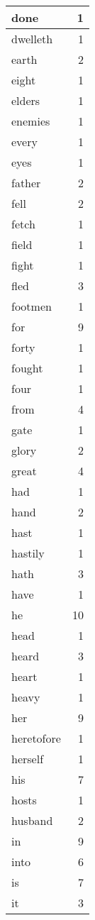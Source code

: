 \begin{center}
\begin{longtable}{l|r}
done & 1 \\ \hline
dwelleth & 1 \\ \hline
earth & 2 \\ \hline
eight & 1 \\ \hline
elders & 1 \\ \hline
enemies & 1 \\ \hline
every & 1 \\ \hline
eyes & 1 \\ \hline
father & 2 \\ \hline
fell & 2 \\ \hline
fetch & 1 \\ \hline
field & 1 \\ \hline
fight & 1 \\ \hline
fled & 3 \\ \hline
footmen & 1 \\ \hline
for & 9 \\ \hline
forty & 1 \\ \hline
fought & 1 \\ \hline
four & 1 \\ \hline
from & 4 \\ \hline
gate & 1 \\ \hline
glory & 2 \\ \hline
great & 4 \\ \hline
had & 1 \\ \hline
hand & 2 \\ \hline
hast & 1 \\ \hline
hastily & 1 \\ \hline
hath & 3 \\ \hline
have & 1 \\ \hline
he & 10 \\ \hline
head & 1 \\ \hline
heard & 3 \\ \hline
heart & 1 \\ \hline
heavy & 1 \\ \hline
her & 9 \\ \hline
heretofore & 1 \\ \hline
herself & 1 \\ \hline
his & 7 \\ \hline
hosts & 1 \\ \hline
husband & 2 \\ \hline
in & 9 \\ \hline
into & 6 \\ \hline
is & 7 \\ \hline
it & 3 \\ \hline

\end{longtable}
\end{center}
